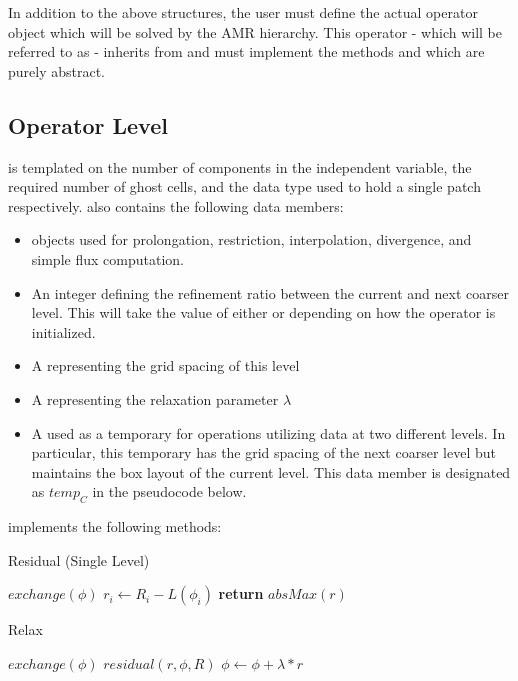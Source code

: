 \documentclass[12pt,a4paper]{article}
\begin{document}
In addition to the above structures, the user must define the actual operator object which will be solved by the AMR hierarchy. This operator - which will be referred to as  - inherits from  and must implement the methods  and  which are purely abstract. 

\subsection{Operator Level}
 is templated on the number of components in the independent variable, the required number of ghost cells, and the data type used to hold a single patch respectively.  also contains the following data members:
\begin{itemize}
\item {} objects used for prolongation, restriction, interpolation, divergence, and simple flux computation. 
\item An integer defining the refinement ratio between the current and next coarser level. This will take the value of either  or  depending on how the operator is initialized.
\item A  representing the grid spacing of this level
\item A  representing the relaxation parameter $\lambda$
\item A  used as a temporary for operations utilizing data at two different levels. In particular, this temporary has the grid spacing of the next coarser level but maintains the box layout of the current level. This data member is designated as $temp_C$ in the pseudocode below.
\end{itemize}

 implements the following methods:

\begin{algorithm}
\caption{Residual (Single Level)}
\begin{algorithmic}[1]
\State $exchange(\phi)$
	\State $r_i \gets R_i - L(\phi_i)$
\EndFor
\State \textbf{return} $absMax(r)$
\EndProcedure
\end{algorithmic}
\end{algorithm}


\begin{algorithm}
\caption{Relax}
\begin{algorithmic}[1]
	\State $exchange(\phi)$
	\State $residual(r, \phi, R)$
	\State $\phi \gets \phi + \lambda * r$
\EndFor
\EndProcedure
\end{algorithmic}
\end{algorithm}
\end{document}
